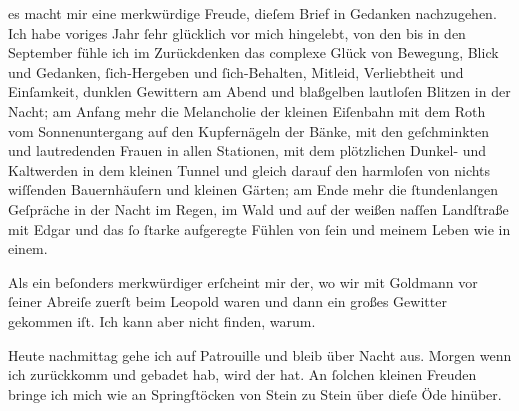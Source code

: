 \pstart
           \raggedleft{}\textcolor{gray}{\textbf{}}\pend
           \vspace{0.5em}
\pstart
           es macht mir eine merkwürdige Freude, dieſem Brief in Gedanken nachzugehen. Ich habe
               voriges Jahr{ }ſehr glücklich vor mich hingelebt, von den \label{K_L00464-1v}\label{K_L00464-1} bis in den September
               fühle ich im Zurückdenken das complexe Glück von Bewegung, Blick und Gedanken,{ }ſich-Hergeben und{ }ſich-Behalten, Mitleid, Verliebtheit und Einſamkeit, dunklen
               Gewittern am Abend und blaßgelben lautloſen Blitzen in der Nacht; am Anfang mehr die
               Melancholie der kleinen Eiſenbahn mit dem Roth vom Sonnenuntergang auf den
               Kupfernägeln der Bänke, mit den geſchminkten und lautredenden {\pb}Frauen in allen Stationen, mit dem
               plötzlichen Dunkel- und Kaltwerden in dem kleinen Tunnel und gleich darauf den
               harmloſen von nichts wiſſenden Bauernhäuſern und kleinen Gärten; am Ende mehr die{ }ſtundenlangen Geſpräche in der Nacht im Regen, im Wald und auf der weißen naſſen
               Landſtraße mit Edgar und das{ }ſo{ }ſtarke
               aufgeregte Fühlen von{ }ſein und meinem Leben wie in einem.\pend
           
\pstart
           Als ein beſonders merkwürdiger \label{K_L00464-2v}\label{K_L00464-2} erſcheint mir der, wo wir mit Goldmann
               vor{ }ſeiner Abreiſe zuerſt beim Leopold waren und
               dann ein großes Gewitter gekommen iſt. Ich kann aber nicht finden, warum.\pend
           
\pstart
           {\pb}Heute nachmittag gehe ich auf
               Patrouille und bleib über Nacht aus. Morgen wenn ich zurückkomm und gebadet hab, wird
               der \label{K_L00464-3v}\label{K_L00464-3} hat. An{ }ſolchen
               kleinen Freuden bringe ich mich wie an Springſtöcken von Stein zu Stein über dieſe
               Öde hinüber.\pend
           
